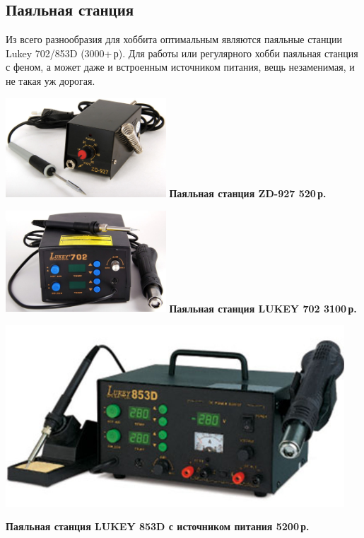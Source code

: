 \subsection{Паяльная станция}

Из всего разнообразия для хоббита оптимальным являются паяльные станции Lukey
702/853D (3000+\,р). Для работы или регулярного хобби паяльная станция с феном,
а может даже и встроенным источником питания, вещь незаменимая, и не такая уж
дорогая.

\includegraphics[width=0.45\textwidth]{tech/tools/solder/ZD927.jpg}
\textbf{Паяльная станция ZD-927 520\,р.}

\includegraphics[width=0.45\textwidth]{tech/tools/solder/Lukey702.jpg}
\textbf{Паяльная станция LUKEY 702 3100\,р.}

\clearpage
\includegraphics[width=0.95\textwidth]{tech/tools/solder/Lukey853D.jpg}

\textbf{Паяльная станция LUKEY 853D с источником питания 5200\,р.}
\clearpage

